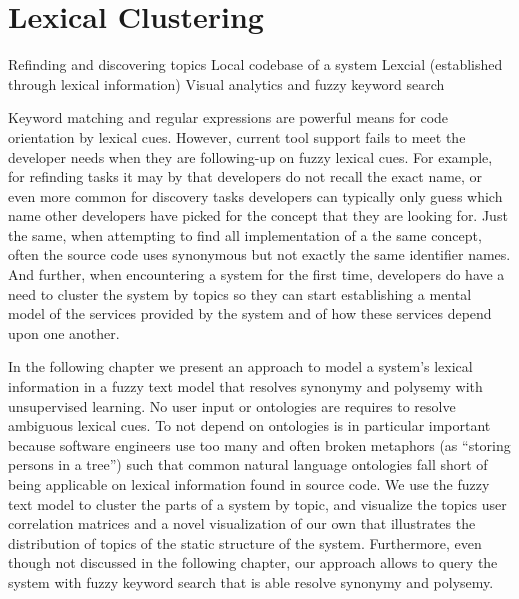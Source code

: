 

\chapter{Lexical Clustering}
\label{the chapter on lexical cues}

\infobox
	{Refinding and discovering topics}
	{Local codebase of a system}
	{Lexcial (established through lexical information)}
	{Visual analytics and fuzzy keyword search}

Keyword matching and regular expressions are powerful means for code orientation by lexical cues. However, current tool support fails to meet the developer needs when they are following-up on fuzzy lexical cues. For example, for refinding tasks it may by that developers do not recall the exact name, or even more common for discovery tasks developers can typically only guess which name other developers have picked for the concept that they are looking for. Just the same, when attempting to find all implementation of a the same concept, often the source code uses synonymous but not exactly the same identifier names. And further, when encountering a system for the first time, developers do have a need to cluster the system by topics so they can start establishing a mental model of the services provided by the system and of how these services depend upon one another. 

In the following chapter we present an approach to model a system's lexical information in a fuzzy text model that resolves synonymy and polysemy with unsupervised learning. No user input or ontologies are requires to resolve ambiguous lexical cues. To not depend on ontologies is in particular important because software engineers use too many and often broken metaphors (as \eg ``storing persons in a tree'') such that common natural language ontologies fall short of being applicable on lexical information found in source code. We use the fuzzy text model to cluster the parts of a system by topic, and visualize the topics user correlation matrices and a novel visualization of our own that illustrates the distribution of topics of the static structure of the system. Furthermore, even though not discussed in the following chapter, our approach allows to query the system with fuzzy keyword search that is able resolve synonymy and polysemy.

